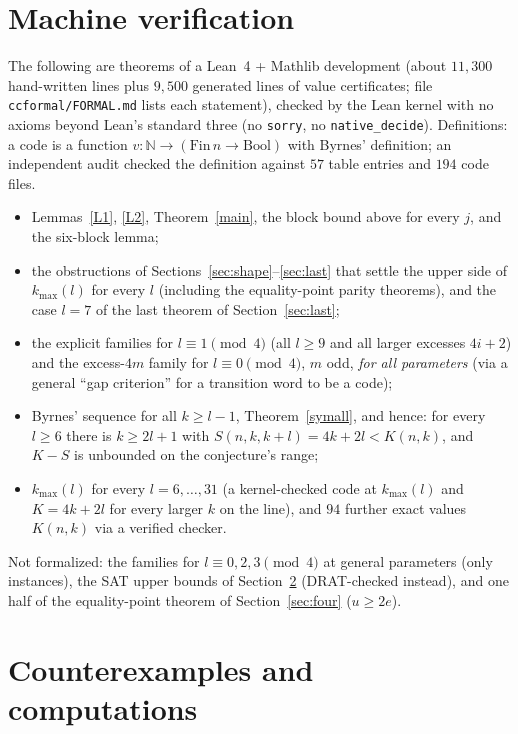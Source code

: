 \documentclass[11pt]{article}
\theoremstyle{remark}
\begin{document}
\section{Machine verification}\label{sec:formal}
The following are theorems of a Lean~4 + Mathlib development (about $11{,}300$ hand-written lines plus $9{,}500$ generated lines of value certificates; file \texttt{ccformal/FORMAL.md} lists each
statement), checked by the Lean kernel with no axioms beyond Lean's standard three (no \texttt{sorry}, no \texttt{native\_decide}).
Definitions: a code is a function $v:\mathbb N\to(\mathrm{Fin}\,n\to\mathrm{Bool})$ with Byrnes' definition; an independent audit
checked the definition against $57$ table entries and $194$ code files.
\begin{itemize}\setlength\itemsep{0pt}
\item Lemmas~\ref{L1}, \ref{L2}, Theorem~\ref{main}, the block bound above for every $j$, and the six-block lemma;
\item the obstructions of Sections~\ref{sec:shape}--\ref{sec:last} that settle the upper side of $k_{\max}(l)$ for every $l$
  (including the equality-point parity theorems), and the case $l=7$ of the last theorem of Section~\ref{sec:last};
\item the explicit families for $l\equiv1\pmod 4$ (all $l\ge 9$ and all larger excesses $4i+2$) and the excess-$4m$ family for
  $l\equiv 0\pmod 4$, $m$ odd, \emph{for all parameters} (via a general ``gap criterion'' for a transition word to be a code);
\item Byrnes' sequence for all $k\ge l-1$, Theorem~\ref{symall}, and hence: for every $l\ge 6$ there is $k\ge 2l+1$ with
  $S(n,k,k+l)=4k+2l<K(n,k)$, and $K-S$ is unbounded on the conjecture's range;
\item $k_{\max}(l)$ for every $l=6,\dots,31$ (a kernel-checked code at $k_{\max}(l)$ and $K=4k+2l$ for every larger $k$ on the line),
  and $94$ further exact values $K(n,k)$ via a verified checker.
\end{itemize}
Not formalized: the families for $l\equiv 0,2,3\pmod 4$ at general parameters (only instances), the SAT upper bounds of
Section~\ref{comp} (DRAT-checked instead), and one half of the equality-point theorem of Section~\ref{sec:four} ($u\ge 2e$).

\section{Counterexamples and computations}\label{comp}
\end{document}
